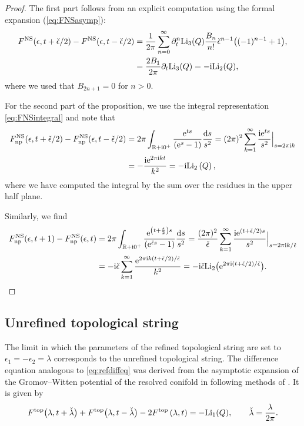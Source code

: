 \documentclass[pdftex]{sigma}
\numberwithin{equation}{section}
\begin{document}
\begin{proof}
The first part follows from an explicit computation using the formal expansion (\ref{eq:FNSasymp}):
\begin{align*}
 F^{\rm NS}(\epsilon,t+\check\epsilon/2)-F^{\rm NS}(\epsilon,t-\check\epsilon/2)&=\frac{1}{2\pi} \sum_{n=0}^{\infty} \partial_t^n {\rm Li}_{3}(Q) \frac{B_n}{n!} \check{\epsilon}^{n-1}\big((-1)^{n-1}+1\big),\\
 &=\frac{2 B_1}{2\pi}\partial_{t}\mathrm{Li}_3(Q) =-\mathrm{i}\mathrm{Li}_2(Q),
 \end{align*}
where we used that $B_{2n+1}=0$ for $n>0$.

For the second part of the proposition, we use the integral representation \eqref{eq:FNSintegral} and note that
\begin{align*}
 F^{\rm NS}_{{\rm np}}(\epsilon,t+\check{\epsilon}/2)-F_{{\rm np}}^{\rm NS}(\epsilon,t-\check{\epsilon}/2) &=2\pi \int_{\mathbb{R}+\mathrm{i} 0^{+}} \frac{{\rm e}^{ts}}{({\rm e}^s-1) } \frac{{\rm d}s}{s^2}
 =(2\pi)^2 \sum_{k=1}^{\infty}\frac{\mathrm{i} {\rm e}^{ts}}{s^2}\Big|_{s=2\pi \mathrm{i} k}\\
 &= -\frac{\mathrm{i} {\rm e}^{2\pi \mathrm{i} kt}}{k^2}
 = -\mathrm{i} {\rm Li}_2 \left(Q\right),
\end{align*}
where we have computed the integral by the sum over the residues in the upper half plane.

Similarly, we find
\begin{align*}
 F^{\rm NS}_{{\rm np}}(\epsilon,t+1)-F_{{\rm np}}^{\rm NS}(\epsilon,t) &=2\pi \int_{\mathbb{R}+\mathrm{i} 0^{+}} \frac{{\rm e}^{\left(t+\frac{\check\epsilon}{2} \right)s}}{({\rm e}^{\check\epsilon s}-1) } \frac{{\rm d}s}{s^2}
 =\frac{(2\pi)^2}{\check\epsilon} \sum_{k=1}^{\infty}\frac{\mathrm{i} {\rm e}^{(t+\check\epsilon/2)s}}{s^2}\Big|_{s=2\pi \mathrm{i} k/\check\epsilon}\\
 &= -\mathrm{i}\check\epsilon \sum_{k=1}^{\infty}\frac{{\rm e}^{2\pi \mathrm{i} k(t+\check\epsilon/2)/\check\epsilon}}{k^2}
 = -\mathrm{i}\check\epsilon \mathrm{Li}_2\big({\rm e}^{2\pi \mathrm{i}(t+\check\epsilon/2)/\check\epsilon}\big).\tag*{\qed}
\end{align*}
\renewcommand{\qed}{}
\end{proof}

\subsection{Unrefined topological string}
The limit in which the parameters of the refined topological string are set to $\epsilon_1=-\epsilon_2=\lambda$ corresponds to the unrefined topological string. The difference equation analogous to \eqref{eq:refdiffeq} was derived from the asymptotic expansion of the Gromov--Witten potential of the resolved conifold in \cite{alim2020difference} following methods of \cite{Iwaki2}. It is given by
\begin{equation*}%
F^{\rm top}\big(\lambda,t+\check{\lambda}\big) + F^{\rm top}\big(\lambda,t-\check{\lambda}\big) - 2 F^{\rm top}\left(\lambda,t\right)=-{\rm Li}_1(Q), \qquad \check{\lambda}=\frac{\lambda}{2\pi}.
\end{equation*}
\end{document}
